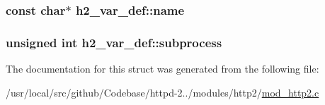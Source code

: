 \subsubsection[{\texorpdfstring{name}{name}}]{\setlength{\rightskip}{0pt plus 5cm}const char$\ast$ h2\+\_\+var\+\_\+def\+::name}\hypertarget{structh2__var__def_ab84d4a8ee14f2aee2f79da0d62cb18c6}{}\label{structh2__var__def_ab84d4a8ee14f2aee2f79da0d62cb18c6}
\subsubsection[{\texorpdfstring{subprocess}{subprocess}}]{\setlength{\rightskip}{0pt plus 5cm}unsigned {\bf int} h2\+\_\+var\+\_\+def\+::subprocess}\hypertarget{structh2__var__def_a78def6d6a9ef79dd3d5d95d21a0540da}{}\label{structh2__var__def_a78def6d6a9ef79dd3d5d95d21a0540da}


The documentation for this struct was generated from the following file\+:\begin{DoxyCompactItemize}
\item 
/usr/local/src/github/\+Codebase/httpd-\/2../modules/http2/\hyperlink{mod__http2_8c}{mod\+\_\+http2.\+c}\end{DoxyCompactItemize}
